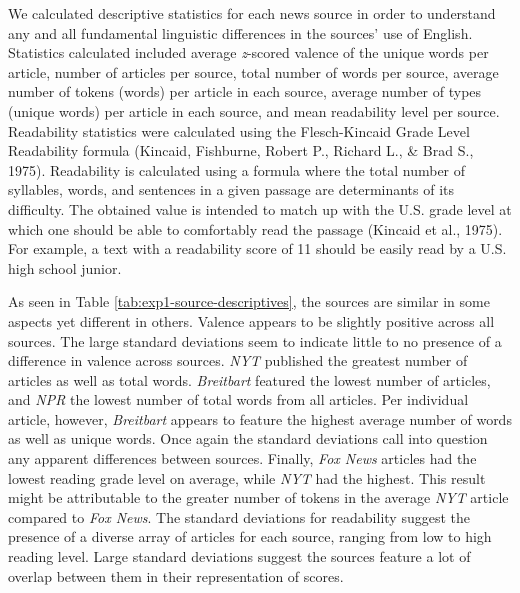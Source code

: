 \documentclass[
  english,
  man,floatsintext]{apa6}
\begin{document}
We calculated descriptive statistics for each news source in order to understand any and all fundamental linguistic differences in the sources' use of English. Statistics calculated included average \emph{z}-scored valence of the unique words per article, number of articles per source, total number of words per source, average number of tokens (words) per article in each source, average number of types (unique words) per article in each source, and mean readability level per source. Readability statistics were calculated using the Flesch-Kincaid Grade Level Readability formula (Kincaid, Fishburne, Robert P., Richard L., \& Brad S., 1975). Readability is calculated using a formula where the total number of syllables, words, and sentences in a given passage are determinants of its difficulty. The obtained value is intended to match up with the U.S. grade level at which one should be able to comfortably read the passage (Kincaid et al., 1975). For example, a text with a readability score of 11 should be easily read by a U.S. high school junior.

As seen in Table \ref{tab:exp1-source-descriptives}, the sources are similar in some aspects yet different in others. Valence appears to be slightly positive across all sources. The large standard deviations seem to indicate little to no presence of a difference in valence across sources. \emph{NYT} published the greatest number of articles as well as total words. \emph{Breitbart} featured the lowest number of articles, and \emph{NPR} the lowest number of total words from all articles. Per individual article, however, \emph{Breitbart} appears to feature the highest average number of words as well as unique words. Once again the standard deviations call into question any apparent differences between sources. Finally, \emph{Fox News} articles had the lowest reading grade level on average, while \emph{NYT} had the highest. This result might be attributable to the greater number of tokens in the average \emph{NYT} article compared to \emph{Fox News}. The standard deviations for readability suggest the presence of a diverse array of articles for each source, ranging from low to high reading level. Large standard deviations suggest the sources feature a lot of overlap between them in their representation of scores.
\end{document}

